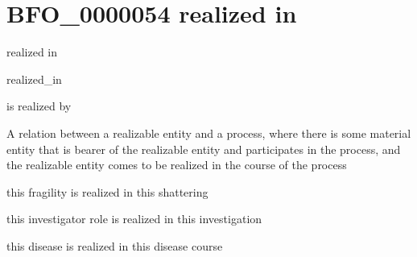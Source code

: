 \documentclass[letterpaper,10pt,english]{sphinxmanual}
\begin{document}
\begin{sphinxShadowBox}

\sphinxAtStartPar
{}
\end{sphinxShadowBox}
\begin{quote}
\label{\detokenize{doc-BFO_0000054:bfo-0000054}}\label{\detokenize{doc-BFO_0000054:realized-in}}\label{\detokenize{doc-BFO_0000054:bfo-0000054}}
\ignorespaces \end{quote}


\section{BFO\_0000054 \sphinxhyphen{} realized in}
\label{\detokenize{doc-BFO_0000054:bfo-0000054-realized-in}}\label{\detokenize{doc-BFO_0000054:index-0}}\label{\detokenize{doc-BFO_0000054::doc}}
\begin{sphinxShadowBox}

\sphinxAtStartPar
realized in
\end{sphinxShadowBox}

\begin{sphinxShadowBox}

\sphinxAtStartPar
realized\_in

\sphinxAtStartPar
is realized by
\end{sphinxShadowBox}

\begin{sphinxShadowBox}

\sphinxAtStartPar
A relation between a realizable entity and a process, where there is some material entity that is bearer of the realizable entity and participates in the process, and the realizable entity comes to be realized in the course of the process
\end{sphinxShadowBox}

\begin{sphinxShadowBox}

\sphinxAtStartPar
this fragility is realized in this shattering

\sphinxAtStartPar
this investigator role is realized in this investigation

\sphinxAtStartPar
this disease is realized in this disease course
\end{sphinxShadowBox}
\end{document}
